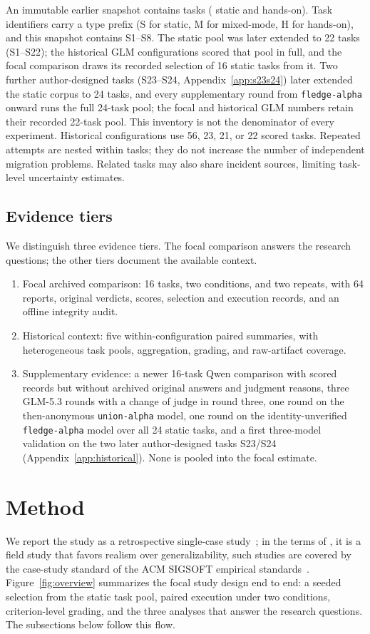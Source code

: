 \documentclass[11pt]{article}
\begin{document}
An immutable earlier snapshot contains \BenchmarkTaskCount{} tasks (\BenchmarkStaticCount{} static and \BenchmarkHandsOnCount{} hands-on). Task identifiers carry a type prefix (S for static, M for mixed-mode, H for hands-on), and this snapshot contains S1--S8. The static pool was later extended to 22 tasks (S1--S22); the historical GLM configurations scored that pool in full, and the focal comparison draws its recorded selection of 16 static tasks from it. Two further author-designed tasks (S23--S24, Appendix~\ref{app:s23s24}) later extended the static corpus to 24 tasks, and every supplementary round from \texttt{fledge-alpha} onward runs the full 24-task pool; the focal and historical GLM numbers retain their recorded 22-task pool. This inventory is not the denominator of every experiment. Historical configurations use 56, 23, 21, or 22 scored tasks. Repeated attempts are nested within tasks; they do not increase the number of independent migration problems. Related tasks may also share incident sources, limiting task-level uncertainty estimates.

\subsection{Evidence tiers}
We distinguish three evidence tiers. The focal comparison answers the research questions; the other tiers document the available context.
\begin{enumerate}
\item Focal archived comparison: 16 tasks, two conditions, and two repeats, with 64 reports, original verdicts, scores, selection and execution records, and an offline integrity audit.
\item Historical context: five within-configuration paired summaries, with heterogeneous task pools, aggregation, grading, and raw-artifact coverage.
\item Supplementary evidence: a newer 16-task Qwen comparison with scored records but without archived original answers and judgment reasons, three GLM-5.3 rounds with a change of judge in round three, one round on the then-anonymous \texttt{union-alpha} model, one round on the identity-unverified \texttt{fledge-alpha} model over all 24 static tasks, and a first three-model validation on the two later author-designed tasks S23/S24 (Appendix~\ref{app:historical}). None is pooled into the focal estimate.
\end{enumerate}

\section{Method}\label{sec:method}
We report the study as a retrospective single-case study~\citep{runeson2009case}; in the terms of \citet{stol2018abc}, it is a field study that favors realism over generalizability, such studies are covered by the case-study standard of the ACM SIGSOFT empirical standards~\citep{ralph2020empirical}. Figure~\ref{fig:overview} summarizes the focal study design end to end: a seeded selection from the static task pool, paired execution under two conditions, criterion-level grading, and the three analyses that answer the research questions. The subsections below follow this flow.
\end{document}
